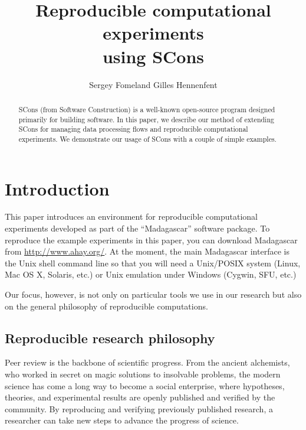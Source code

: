 \title{Reproducible computational experiments \\ using SCons}


\author{Sergey Fomel\/\footnotemark[1] and Gilles Hennenfent\/\footnotemark[2]}


\maketitle

\begin{abstract}
  SCons (from Software Construction) is a well-known open-source
  program designed primarily for building software. In this paper, we
  describe our method of extending SCons for managing data processing
  flows and reproducible computational experiments. We demonstrate our
  usage of SCons with a couple of simple examples.
\end{abstract}

\section{Introduction}

This paper introduces an environment for reproducible computational
experiments developed as part of the ``Madagascar'' software package.
To reproduce the example experiments in this paper, you can download
Madagascar from \url{http://www.ahay.org/}. At the moment, the
main Madagascar interface is the Unix shell command line so that you
will need a Unix/POSIX system (Linux, Mac OS X, Solaris, etc.) or Unix
emulation under Windows (Cygwin, SFU, etc.)

Our focus, however, is not only on particular
tools we use in our research but also on the general philosophy of
reproducible computations.

\subsection{Reproducible research philosophy}

Peer review is the backbone of scientific progress. From the ancient
alchemists, who worked in secret on magic solutions to insolvable
problems, the modern science has come a long way to become a social
enterprise, where hypotheses, theories, and experimental results are
openly published and verified by the community. By reproducing and
verifying previously published research, a researcher can take new
steps to advance the progress of science.

